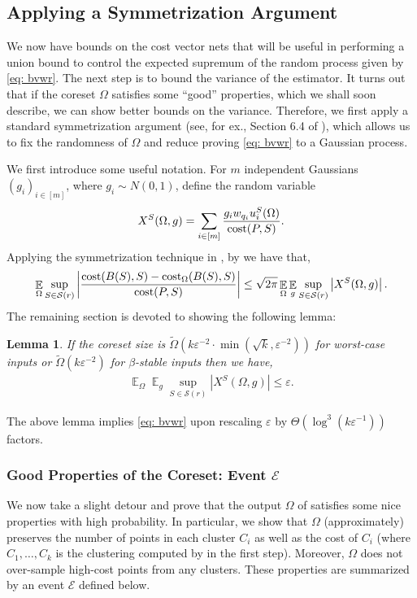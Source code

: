 \documentclass[11pt]{article}
\newtheorem{lemma}{Lemma}[section]
\theoremstyle{restate}
\theoremstyle{definition}
\newcommand{\eps}{\ensuremath{\varepsilon}}
\newcommand{\E}{\mathop{\mathbb{E}}}
\newcommand{\cost}{\textnormal{cost}}
\newcommand{\costom}{\cost_\Omega} %
\newcommand{\csize}{m}
\newcommand{\inSR}{\in \mathcal{S}(r)}
\begin{document}
\subsection{Applying a  Symmetrization Argument}\label{sec: symmetrizaion}
We now have bounds on the cost vector nets that will be useful in performing a union bound to control the expected supremum of the random process given by \eqref{eq: bvwr}. The next step is to bound the variance of the estimator. It turns out that if the coreset $\Omega$ satisfies some ``good'' properties, which we shall soon describe, we can show better bounds on the variance. Therefore, we first apply a standard symmetrization argument (see, for ex., Section 6.4 of \cite{vershynin2018high}), which allows us to fix the randomness of $\Omega$ and reduce proving \eqref{eq: bvwr} to a Gaussian process.

We first introduce some useful notation. For $\csize$  independent Gaussians $(g_i)_{i\in [m]}$, where $g_i\sim N(0,1)$, define the random variable
\begin{align}
\label{def:X}
    X^S(\Omega, g) = \sum_{i \in [m]} \frac{g_i w_{q_i} u_i^S(\Omega)}{\cost(P,S)}.
\end{align}
Applying the symmetrization technique in , by  we have that,
\begin{align}\label{eq:sym}
	\E_{\Omega} \sup_{S \inSR}\left\rvert\frac{\cost(B(S), S) - \costom(B(S), S)}{\cost(P,S)} \right\rvert\leq \sqrt{2\pi} \E_{ \Omega} \E_{g} \sup_{S \inSR} \left\lvert X^S(\Omega,g)\right\rvert.
\end{align}
\noindent The remaining section is devoted to showing the following lemma:
\begin{lemma}\label{eq: inter-xs}
If the coreset size is ${\tilde{\Omega}(k \eps^{-2} \cdot \min (\sqrt{k}, \eps^{-2}))}$ for worst-case inputs or $ \tilde{\Omega}(k \eps^{-2})$ for $\beta$-stable inputs then we have,
\begin{align*}
    \E_{\Omega} \E_g \sup_{S \inSR} \left\lvert X^S(\Omega,g)\right\rvert \leq \eps.
\end{align*}
\end{lemma}
The above lemma implies \eqref{eq: bvwr} upon rescaling $\eps$ by $\Theta(\log^3(k\eps^{-1}))$ factors.
\subsubsection{\texorpdfstring{Good Properties of the Coreset: Event $\mathcal{E}$}{Good Event E}}
We now take a slight detour and prove that the output $\Omega$ of  satisfies some nice properties with high probability. In particular, we show that $\Omega$ (approximately) preserves the number of points in each cluster $C_i$ as well as the cost of $C_i$ (where $C_1, \ldots, C_k$ is the clustering computed by  in the first step). Moreover, $\Omega$ does not over-sample high-cost points from any clusters. These properties are summarized by an event $\mathcal{E}$ defined below.
\end{document}
